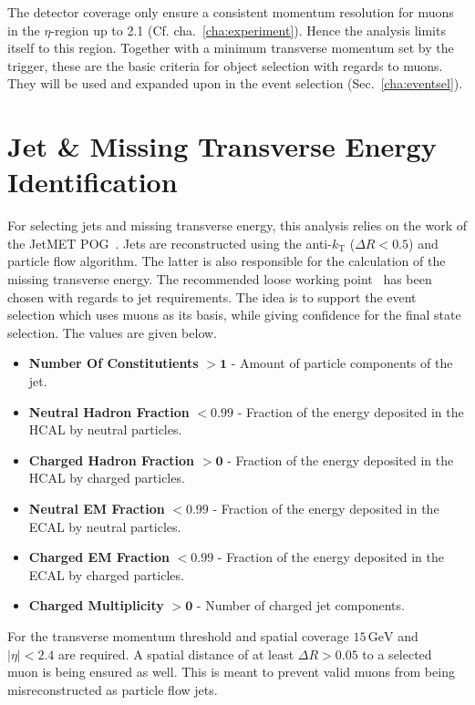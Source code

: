 The detector coverage only ensure a consistent momentum resolution for muons in the $\eta$-region up to 2.1 (Cf. cha.~\ref{cha:experiment}). Hence the analysis limits itself to this region. Together with a minimum transverse momentum set by the trigger, these are the basic criteria for object selection with regards to muons. They will be used and expanded upon in the event selection (Sec.~\ref{cha:eventsel}). 


\section{Jet \& Missing Transverse Energy Identification}
\label{sec:jetid}

For selecting jets and missing transverse energy, this analysis relies on the work of the JetMET POG~\cite{jmepog}. Jets are reconstructed using the anti-$k_{\text{T}}$ ($\Delta R < 0.5$) and particle flow algorithm. The latter is also responsible for the calculation of the missing transverse energy. The recommended loose working point~\cite{jetid, jetidpf} has been chosen with regards to jet requirements. The idea is to support the event selection which uses muons as its basis, while giving confidence for the final state selection. The values are given below.

\begin{itemize}
\item \textbf{Number Of Constitutients} $\mathbf{> 1}$ - Amount of particle components of the jet.
\item \textbf{Neutral Hadron Fraction} $\mathbf{< 0.99}$ - Fraction of the energy deposited in the HCAL by neutral particles.
\item \textbf{Charged Hadron Fraction} $\mathbf{> 0}$ - Fraction of the energy deposited in the HCAL by charged particles.
\item \textbf{Neutral EM Fraction} $\mathbf{< 0.99}$ - Fraction of the energy deposited in the ECAL by neutral particles.
\item \textbf{Charged EM Fraction} $\mathbf{< 0.99}$ - Fraction of the energy deposited in the ECAL by charged particles.
\item \textbf{Charged Multiplicity} $\mathbf{> 0}$ - Number of charged jet components.
\end{itemize}

For the transverse momentum threshold and spatial coverage $15\,\text{GeV}$ and $|\eta|  < 2.4$ are required. A spatial distance of at least $\Delta R > 0.05$ to a selected muon is being ensured as well. This is meant to prevent valid muons from being misreconstructed as particle flow jets. 

